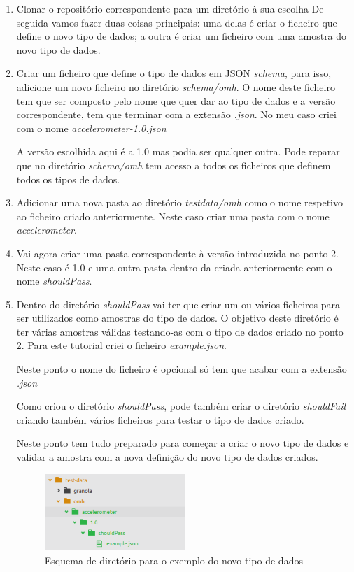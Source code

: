 \begin{enumerate}
  \item Clonar o repositório correspondente para um diretório à sua escolha 
  De seguida vamos fazer duas coisas principais: uma delas é criar o ficheiro que define o novo tipo de dados; a outra é criar um ficheiro com uma amostra do novo tipo de dados.
  \item Criar um ficheiro que define o tipo de dados em \gls{JSON} \textit{schema}, para isso, adicione um novo ficheiro no diretório \textit{schema/omh}. O nome deste ficheiro tem que ser composto pelo nome que quer dar ao tipo de dados e a versão correspondente, tem que terminar com a extensão \textit{.json}. No meu caso criei com o nome \textit{accelerometer-1.0.json}  \par A versão escolhida aqui é a 1.0 mas podia ser qualquer outra. Pode reparar que no diretório \textit{schema/omh} tem acesso a todos os ficheiros que definem todos os tipos de dados.
  \item Adicionar uma nova pasta ao diretório \textit{testdata/omh} como o nome respetivo ao ficheiro criado anteriormente. Neste caso criar uma pasta com o nome \textit{accelerometer}.
  \item Vai agora criar uma pasta correspondente à versão introduzida no ponto 2. Neste caso é 1.0 e uma outra pasta dentro da criada anteriormente com o nome \textit{shouldPass}.
  \item Dentro do diretório \textit{shouldPass} vai ter que criar um ou vários ficheiros para ser utilizados como amostras do tipo de dados. O objetivo deste diretório é ter várias amostras válidas testando-as com o tipo de dados criado no ponto 2. Para este tutorial criei o ficheiro \textit{example.json}. \par Neste ponto o nome do ficheiro é opcional só tem que acabar com a extensão \textit{.json}\par
  Como criou o diretório \textit{shouldPass}, pode também criar o diretório \textit{shouldFail} criando também vários ficheiros para testar o tipo de dados criado. \par 
  Neste ponto tem tudo preparado para começar a criar o novo tipo de dados e validar a amostra com a nova definição do novo tipo de dados criados.
  
  \begin{figure}[!ht]
  \centering
  \includegraphics[width=0.5\textwidth]{imgs/newsampledata.png}
  \caption[Esquema de diretório para o exemplo do novo tipo de dados]{Esquema de diretório para o exemplo do novo tipo de dados}
  

\end{figure}
\end{enumerate}
